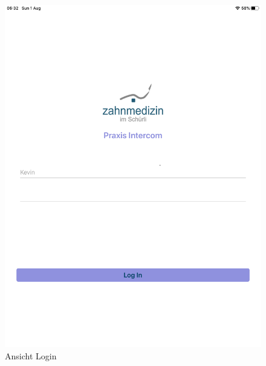 \begin{figure}[h]
    \centering
    \begin{minipage}[b]{0.4\textwidth}
        \includegraphics[width=\textwidth]{graphics/screenshots/placeholder}
        \caption{Ansicht Login}
    \end{minipage}
    \hfill
    \begin{minipage}[b]{0.4\textwidth}

\end{minipage}
\end{figure}
